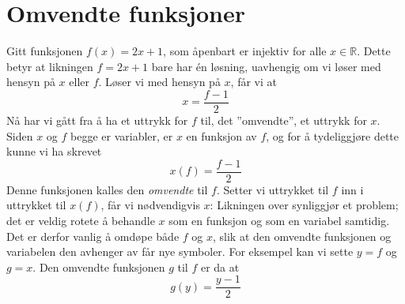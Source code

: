 \section{Omvendte funksjoner}
Gitt funksjonen $ f(x)=2x+1 $, som åpenbart er injektiv for alle $ x\in \mathbb{R} $. Dette betyr at likningen $ f=2x+1 $ bare har én løsning, uavhengig om vi løser med hensyn på $ x $ eller $ f $. Løser vi med hensyn på $ x $, får vi at
\[ x=\frac{f-1}{2} \]
Nå har vi gått fra å ha et uttrykk for $ f $ til, det ''omvendte'', et uttrykk for $ x $. Siden $ x $ og $ f $ begge er variabler, er $ x $ en funksjon av $ f $, og for å tydeliggjøre dette kunne vi ha skrevet
\[ x(f)=\frac{f-1}{2} \]
Denne funksjonen kalles den \textit{omvendte} til $ f $. Setter vi uttrykket til $ f $ inn i uttrykket til $ x(f) $, får vi nødvendigvis $ x $:
Likningen over synliggjør et problem; det er veldig rotete å behandle $ x $ som en funksjon og som en variabel samtidig. Det er derfor vanlig å omdøpe både $ f $ og $ x $, slik at den omvendte funksjonen og variabelen den avhenger av får nye symboler. For eksempel kan vi sette $ y=f$ og $ g=x $. Den omvendte funksjonen $ g $ til $ f $ er da at
\[ g(y)=\frac{y-1}{2} \]
 \newpage
{}
\newpage
{}

